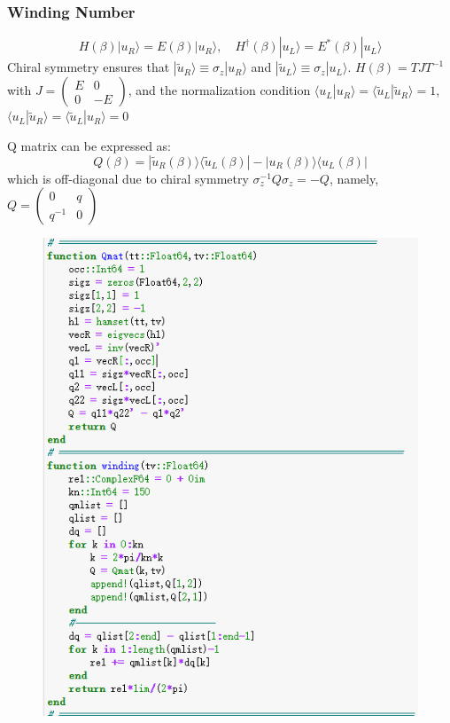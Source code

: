 \documentclass{beamer}
\begin{document}
  \begin{frame}
    \frametitle{Winding Number}
    \begin{equation}
    H(\beta)|u_R\rangle=E(\beta)|u_R\rangle,\quad H^\dagger(\beta)|u_L\rangle=E^{*}(\beta)|u_L\rangle
    \end{equation}
    Chiral symmetry ensures that $|\tilde{u}_R\rangle\equiv\sigma_z|u_R\rangle$ and $|\tilde{u}_L\rangle\equiv\sigma_z|u_L\rangle$.  $H(\beta)=TJT^{-1}$ with $J=\left(\begin{array}{cc}
    E&0\\
    0&-E
    \end{array}\right)$, and the normalization condition $\langle u_L|u_R\rangle=\langle\tilde{u}_L|\tilde{u}_R\rangle=1$, $\langle u_L|\tilde{u}_R\rangle=\langle \tilde{u}_L|u_R\rangle=0$
    
    Q matrix can be expressed as:
    \begin{equation}
    Q(\beta)=|\tilde{u}_R(\beta)\rangle\langle \tilde{u}_L(\beta)|-|u_R(\beta)\rangle\langle u_L(\beta)|
    \end{equation}
    which is off-diagonal due to chiral symmetry $\sigma_z^{-1}Q\sigma_z=-Q$, namely, $Q=\left(\begin{array}{cc}
    0&q\\
    q^{-1}&0
    \end{array}\right)$
  \end{frame}
\begin{frame}
\begin{figure}
\includegraphics[scale=0.65]{figure/code2.png}
\end{figure}
\end{frame}
\end{document}
